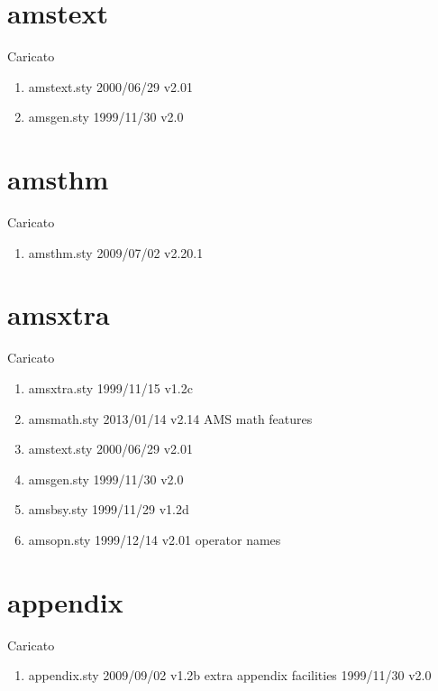 \section{amstext}

Caricato 
\begin{enumerate}
\item amstext.sty 2000/06/29 v2.01
\item amsgen.sty 1999/11/30 v2.0
\end{enumerate}
\section{amsthm}

Caricato 
\begin{enumerate}
\item amsthm.sty 2009/07/02 v2.20.1
\end{enumerate}
\section{amsxtra}

Caricato 
\begin{enumerate}
 \item amsxtra.sty 1999/11/15 v1.2c
 \item amsmath.sty 2013/01/14 v2.14 AMS math features
 \item amstext.sty 2000/06/29 v2.01
 \item amsgen.sty 1999/11/30 v2.0
 \item amsbsy.sty 1999/11/29 v1.2d
 \item amsopn.sty 1999/12/14 v2.01 operator names
\end{enumerate}
\section{appendix}

Caricato 
\begin{enumerate}
\item appendix.sty 2009/09/02 v1.2b extra appendix facilities 1999/11/30 v2.0
\end{enumerate}
